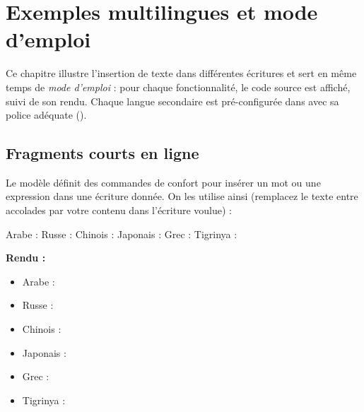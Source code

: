 \chapter{Exemples multilingues et mode d'emploi}
\label{chap:exemples}

Ce chapitre illustre l'insertion de texte dans différentes écritures et
sert en même temps de \emph{mode d'emploi} : pour chaque fonctionnalité,
le code source est affiché, suivi de son rendu. Chaque langue secondaire
est pré-configurée dans  avec sa police adéquate
().

\section{Fragments courts en ligne}

Le modèle définit des commandes de confort pour insérer un mot ou une
expression dans une écriture donnée. On les utilise ainsi (remplacez le
texte entre accolades par votre contenu dans l'écriture voulue) :

\begin{latexcode}
Arabe    :       %
Russe    : 
Chinois  : 
Japonais : 
Grec     : 
Tigrinya : 
\end{latexcode}

\noindent \textbf{Rendu :}

\begin{itemize}
  \item Arabe : 
  \item Russe : 
  \item Chinois : 
  \item Japonais : 
  \item Grec : 
  \item Tigrinya : 
\end{itemize}

